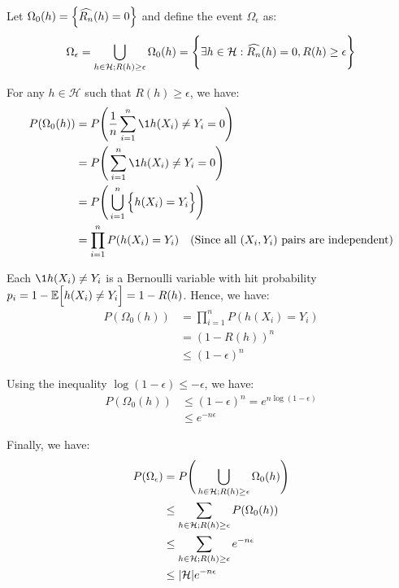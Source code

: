 \begin{proof*}
    Let $\Omega_0(h) = \Big\{ \widehat{R_n}(h) = 0 \Big\}$ and define the event $\Omega_\epsilon$ as:
    \begin{align*}
        \Omega_\epsilon = \bigcup_{h\in\mathcal{H}; R(h)\ge\epsilon} \Omega_0(h) = \Bigg\{ 
            \exists h \in \mathcal{H} : \widehat{R_n}(h) = 0, R(h)\ge\epsilon
         \Bigg\} 
    \end{align*}

    \noindent For any $h\in\mathcal{H}$ such that $R(h)\ge\epsilon$, we have:
    \begin{align*}
        P(\Omega_0(h))
            &= P\biggRound{ \frac{1}{n}\sum_{i=1}^n \1{h(X_i) \ne Y_i} = 0 } \\
            &= P\biggRound{ \sum_{i=1}^n \1{h(X_i) \ne Y_i} = 0 } \\
            &= P\biggRound{ \bigcup_{i=1}^n \bigCurl{ h(X_i) = Y_i } } \\
            &= \prod_{i=1}^n P(h(X_i) = Y_i) \ \ \ (\text{Since all } (X_i, Y_i) \text{ pairs are independent})
    \end{align*}

    \noindent Each $\1{h(X_i) \ne Y_i}$ is a Bernoulli variable with hit probability $p_i=1-\mathbb{E}\Big[  h(X_i) \ne Y_i \Big] = 1 - R(h)$. Hence, we have:
    \begin{align*}
        P(\Omega_0(h))
            &= \prod_{i=1}^n P(h(X_i) = Y_i) \\
            &= (1 - R(h))^n \\
            &\le (1-\epsilon)^n
    \end{align*}

    \noindent Using the inequality $\log(1-\epsilon) \le -\epsilon$, we have:
    \begin{align*}
        P(\Omega_0(h))
            &\le (1-\epsilon)^n = e^{n\log(1-\epsilon)} \\
            &\le e^{-n\epsilon}
    \end{align*}

    \noindent Finally, we have:
    \begin{align*}
        P(\Omega_\epsilon)
            &= P\Bigg( \bigcup_{h\in\mathcal{H}; R(h)\ge\epsilon} \Omega_0(h) \Bigg) \\
            &\le \sum_{h\in\mathcal{H}; R(h)\ge\epsilon} P(\Omega_0(h)) \\
            &\le \sum_{h\in\mathcal{H}; R(h)\ge\epsilon} e^{-n\epsilon} \\
            &\le |\mathcal{H}|e^{-n\epsilon}
    \end{align*}
\end{proof*}


